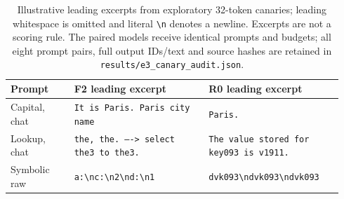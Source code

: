 \begin{table}[t]
\centering\small
\begin{tabular}{@{}p{0.18\linewidth}p{0.38\linewidth}p{0.38\linewidth}@{}}
\toprule
Prompt & F2 leading excerpt & R0 leading excerpt \\
\midrule
Capital, chat & \texttt{It is Paris. Paris city name} & \texttt{Paris.} \\
Lookup, chat & \texttt{the, the.  ----> select the3 to the3.} & \texttt{The value stored for key093 is v1911.} \\
Symbolic raw & \texttt{a:\textbackslash{}nc:\textbackslash{}n2\textbackslash{}nd:\textbackslash{}n1} & \texttt{dvk093\textbackslash{}ndvk093\textbackslash{}ndvk093} \\
\bottomrule
\end{tabular}
\caption{Illustrative leading excerpts from exploratory 32-token canaries; leading whitespace is omitted and literal \texttt{\textbackslash{}n} denotes a newline. Excerpts are not a scoring rule. The paired models receive identical prompts and budgets; all eight prompt pairs, full output IDs/text and source hashes are retained in \texttt{results/e3\_canary\_audit.json}.}
\label{tab:e3-canary}
\end{table}
